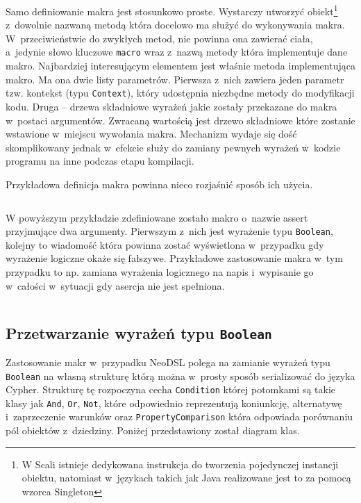 \documentclass{xmgr}
\begin{document}
Samo definiowanie makra jest stosunkowo proste. Wystarczy utworzyć obiekt\footnote{W Scali istnieje dedykowana instrukcja do tworzenia pojedynczej instancji obiektu, natomiast w~językach takich jak Java realizowane jest to za pomocą wzorca Singleton} z~dowolnie nazwaną metodą która docelowo ma służyć do wykonywania makra. W~przeciwieństwie do zwykłych metod, nie powinna ona zawierać ciała, a~jedynie słowo kluczowe \texttt{macro} wraz z~nazwą metody która implementuje dane makro. Najbardziej interesującym elementem jest właśnie metoda implementująca makro. Ma ona dwie listy parametrów. Pierwsza z~nich zawiera jeden parametr tzw. kontekst (typu \texttt{Context}), który udostępnia niezbędne metody do modyfikacji kodu. Druga --  drzewa składniowe wyrażeń jakie zostały przekazane do makra w~postaci argumentów. Zwracaną wartością jest drzewo składniowe które zostanie wstawione w~miejscu wywołania makra. Mechanizm wydaje się dość skomplikowany jednak w~efekcie służy do zamiany pewnych wyrażeń w~kodzie programu na inne podczas etapu kompilacji.

\medskip\noindent Przykładowa definicja makra powinna nieco rozjaśnić sposób ich użycia.

\newpage

\inputminted{scala}{listings/scala/macro-sample.scala}

W powyższym przykładzie zdefiniowane zostało makro o~nazwie assert przyjmujące dwa argumenty. Pierwszym z~nich jest wyrażenie typu \texttt{Boolean}, kolejny to wiadomość która powinna zostać wyświetlona w~przypadku gdy wyrażenie logiczne okaże się fałszywe. Przykładowe zastosowanie makra w~tym przypadku to np. zamiana wyrażenia logicznego na napis i~wypisanie go w~całości w~sytuacji gdy asercja nie jest spełniona.

\inputminted{scala}{listings/scala/macro-usage-assert.scala}

\newpage

\subsection{Przetwarzanie wyrażeń typu \texttt{Boolean}}

Zastosowanie makr w~przypadku NeoDSL polega na zamianie wyrażeń typu \texttt{Boolean} na własną strukturę którą można w~prosty sposób serializować do języka Cypher. 
Strukturę tę rozpoczyna cecha \texttt{Condition} której potomkami są takie klasy jak \texttt{And}, \texttt{Or}, \texttt{Not}, które odpowiednio reprezentują koniunkcję, alternatywę i~zaprzeczenie warunków oraz \texttt{PropertyComparison} która odpowiada porównaniu pól obiektów z~dziedziny. Poniżej przedstawiony został diagram klas.
\end{document}
